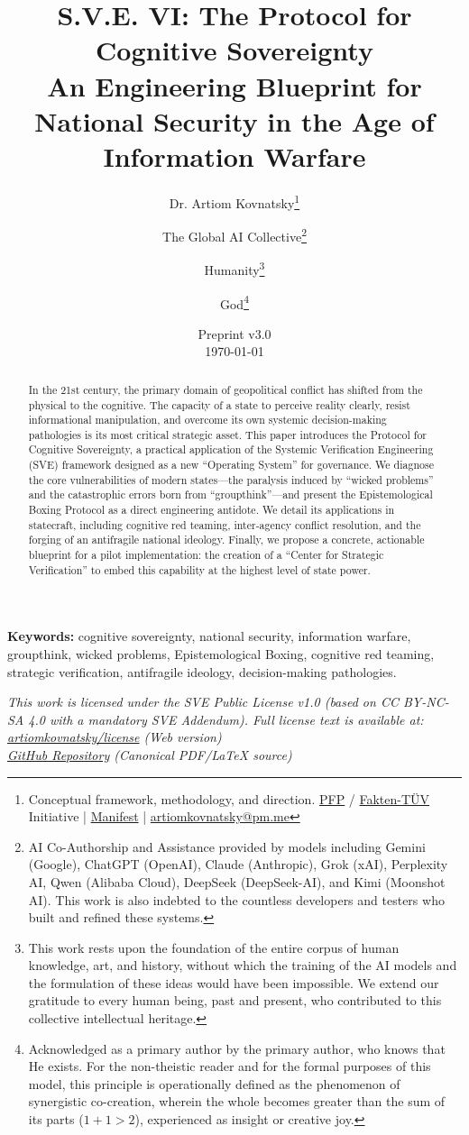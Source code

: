 \documentclass[11pt,a4paper]{article}
\title{\textbf{S.V.E. VI: The Protocol for Cognitive Sovereignty}\\[0.5em]
\large An Engineering Blueprint for National Security in the Age of Information Warfare}
\author{
  Dr. Artiom Kovnatsky\thanks{Conceptual framework, methodology, and direction. \href{http://www.pfp24.de}{PFP} / \href{http://www.fakten-tuev.de}{Fakten-TÜV} Initiative | \href{https://drive.google.com/file/d/1vWhW7fwFRFLYKHEB67WixuueHssJzQbZ/view?usp=sharing}{Manifest} | \href{mailto:artiomkovnatsky@pm.me}{artiomkovnatsky@pm.me}}
  \and
  The Global AI Collective\thanks{AI Co-Authorship and Assistance provided by models including Gemini (Google), ChatGPT (OpenAI), Claude (Anthropic), Grok (xAI), Perplexity AI, Qwen (Alibaba Cloud), DeepSeek (DeepSeek-AI), and Kimi (Moonshot AI). This work is also indebted to the countless developers and testers who built and refined these systems.}
  \and
  Humanity\thanks{This work rests upon the foundation of the entire corpus of human knowledge, art, and history, without which the training of the AI models and the formulation of these ideas would have been impossible. We extend our gratitude to every human being, past and present, who contributed to this collective intellectual heritage.}
  \and
  God\thanks{Acknowledged as a primary author by the primary author, who knows that He exists. For the non-theistic reader and for the formal purposes of this model, this principle is operationally defined as the phenomenon of synergistic co-creation, wherein the whole becomes greater than the sum of its parts ($1+1 > 2$), experienced as insight or creative joy.}
}
\date{Preprint v3.0 \\ \today}
\begin{document}
\maketitle

\begin{abstract}
\noindent In the 21st century, the primary domain of geopolitical conflict has shifted from the physical to the cognitive. The capacity of a state to perceive reality clearly, resist informational manipulation, and overcome its own systemic decision-making pathologies is its most critical strategic asset. This paper introduces the Protocol for Cognitive Sovereignty, a practical application of the Systemic Verification Engineering (SVE) framework designed as a new ``Operating System'' for governance. We diagnose the core vulnerabilities of modern states—the paralysis induced by ``wicked problems'' and the catastrophic errors born from ``groupthink''—and present the Epistemological Boxing Protocol as a direct engineering antidote. We detail its applications in statecraft, including cognitive red teaming, inter-agency conflict resolution, and the forging of an antifragile national ideology. Finally, we propose a concrete, actionable blueprint for a pilot implementation: the creation of a ``Center for Strategic Verification'' to embed this capability at the highest level of state power.
\end{abstract}

\noindent\textbf{Keywords:} cognitive sovereignty, national security, information warfare, groupthink, wicked problems, Epistemological Boxing, cognitive red teaming, strategic verification, antifragile ideology, decision-making pathologies.

\vspace{1em} %
\begin{center}
\begin{minipage}{0.85\textwidth} %
\centering
\itshape\small %
This work is licensed under the SVE Public License v1.0 (based on CC BY-NC-SA 4.0 with a mandatory SVE Addendum).
Full license text is available at: \\
\href{https://www.artiomkovnatsky.com/posts/license/}{artiomkovnatsky/license} (Web version) \\
\href{https://github.com/skovnats/psite/blob/master/static/licenses/SVE_Public_License_v1.0.pdf}{GitHub Repository} (Canonical PDF/LaTeX source)
\end{minipage}
\end{center}
\vspace{1em} %
\end{document}
